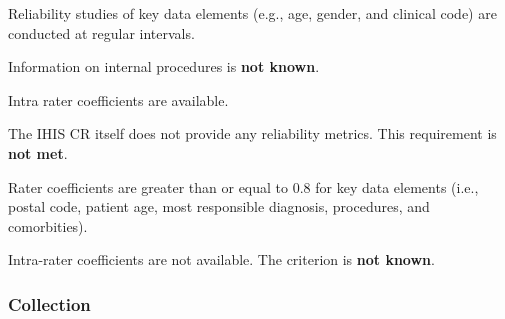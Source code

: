 \begin{QandA}
    \item Reliability studies of key data elements (e.g., age, gender, and clinical code) are conducted at regular intervals.
    \begin{answered}
        Information on internal procedures is \textbf{not known}.
    \end{answered}

    \item Intra rater coefficients are available.
    \begin{answered}
        The IHIS CR itself does not provide any reliability metrics.
        This requirement is \textbf{not met}.
    \end{answered}

    \item Rater coefficients are greater than or equal to 0.8 for key data elements (i.e., postal code, patient age, most responsible diagnosis, procedures, and comorbities).
    \begin{answered}
        Intra-rater coefficients are not available.
        The criterion is \textbf{not known}.
    \end{answered}

\end{QandA}

\subsubsection{Collection}

